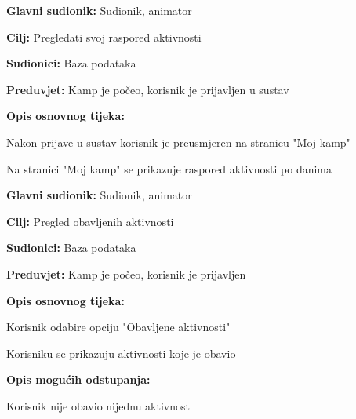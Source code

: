 \begin{packed_item}
\begin{packed_item}
						\item \textbf{Glavni sudionik: }Sudionik, animator
						\item  \textbf{Cilj:} Pregledati svoj raspored aktivnosti
						\item  \textbf{Sudionici:} Baza podataka
						\item  \textbf{Preduvjet:} Kamp je počeo, korisnik je prijavljen u sustav
						\item  \textbf{Opis osnovnog tijeka:}
						
						\item[] \begin{packed_enum}
							
							\item Nakon prijave u sustav korisnik je preusmjeren na stranicu "Moj kamp"
							\item Na stranici "Moj kamp" se prikazuje raspored aktivnosti po danima
						\end{packed_enum}
					\end{packed_item}
				
					\noindent {}
					\begin{packed_item}
						
						\item \textbf{Glavni sudionik: }Sudionik, animator
						\item  \textbf{Cilj:} Pregled obavljenih aktivnosti
						\item  \textbf{Sudionici:} Baza podataka
						\item  \textbf{Preduvjet:} Kamp je počeo, korisnik je prijavljen
						\item  \textbf{Opis osnovnog tijeka:}
						
						\item[] \begin{packed_enum}
							
							\item Korisnik odabire opciju "Obavljene aktivnosti"
							\item Korisniku se prikazuju aktivnosti koje je obavio
						\end{packed_enum}
						
						\item  \textbf{Opis mogućih odstupanja:}
						
						\item[] \begin{packed_item}
							
							\item[2.a] Korisnik nije obavio nijednu aktivnost
							\item[] \begin{packed_enum}
								

\end{packed_enum}
\end{packed_item}
\end{packed_item}
\end{packed_item}
